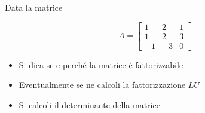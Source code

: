 \noindent Data la matrice

\bigskip
\[
A=\left[
\begin{array}{ccc}
1 & 2 & 1 \\
1 & 2 & 3\\
-1 & -3 & 0
\end{array}\right]
\]


\begin{itemize}
\item Si dica se e perch\'e la matrice \`e fattorizzabile
\item Eventualmente se ne calcoli la
fattorizzazione $LU$
\item Si calcoli il determinante della matrice


\end{itemize}
